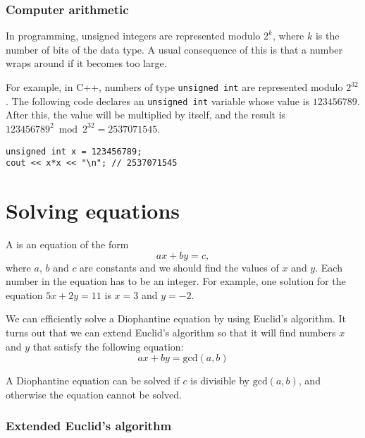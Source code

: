 \subsubsection{Computer arithmetic}

In programming, unsigned integers are represented modulo $2^k$,
where $k$ is the number of bits of the data type.
A usual consequence of this is that a number wraps around
if it becomes too large.

For example, in C++, numbers of type \texttt{unsigned int}
are represented modulo $2^{32}$.
The following code declares an \texttt{unsigned int}
variable whose value is $123456789$.
After this, the value will be multiplied by itself,
and the result is
$123456789^2 \bmod 2^{32} = 2537071545$.

\begin{lstlisting}
unsigned int x = 123456789;
cout << x*x << "\n"; // 2537071545
\end{lstlisting}

\section{Solving equations}


A 
is an equation of the form
\[ ax + by = c, \]
where $a$, $b$ and $c$ are constants
and we should find the values of $x$ and $y$.
Each number in the equation has to be an integer.
For example, one solution for the equation
$5x+2y=11$ is $x=3$ and $y=-2$.


We can efficiently solve a Diophantine equation
by using Euclid's algorithm.
It turns out that we can extend Euclid's algorithm
so that it will find numbers $x$ and $y$
that satisfy the following equation:
\[
ax + by = \textrm{gcd}(a,b)
\]

A Diophantine equation can be solved if
$c$ is divisible by
$\textrm{gcd}(a,b)$,
and otherwise the equation cannot be solved.


\subsubsection*{Extended Euclid's algorithm}

